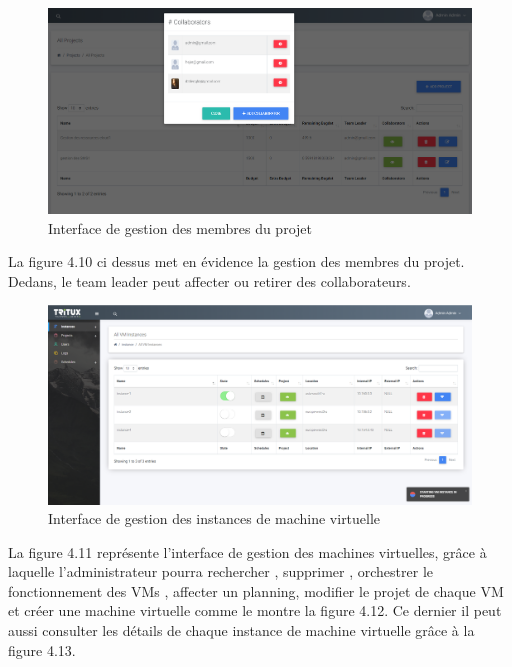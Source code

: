 	\begin{figure}[H]
	\centering
	\includegraphics[scale=0.35]{membreProjets.PNG}
	\caption{Interface de gestion des membres du projet}
	\label{Interface de gestion des membres du projet}
\end{figure}
La figure 4.10 ci dessus met en évidence la gestion des membres du projet. Dedans, le team leader peut affecter ou retirer des collaborateurs.
\begin{figure}[H]
	\centering
	\includegraphics[scale=0.273]{instances.png}
	\caption{Interface de gestion des instances de machine virtuelle}
	\label{Interface de gestion des instances de machine virtuelle}
\end{figure}

La figure 4.11 représente l'interface de gestion des machines virtuelles, grâce à laquelle l'administrateur
pourra rechercher , supprimer , orchestrer le fonctionnement des VMs , affecter un planning, modifier le projet de chaque VM et créer une machine virtuelle comme le montre la figure 4.12. 
Ce dernier il peut aussi consulter les détails de chaque instance de machine virtuelle grâce à la figure 4.13.

